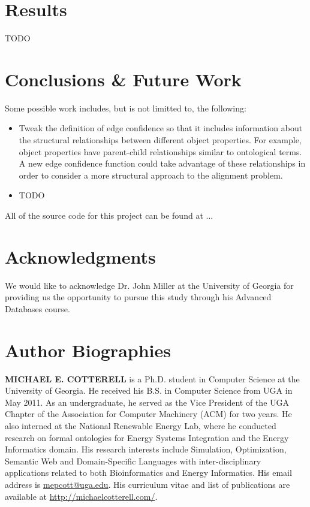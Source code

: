\documentclass[letterpaper,twocolumn,12pt]{article}
\begin{document}
\section{Results}
\label{sec:results}

TODO

\section{Conclusions \& Future Work}
\label{sec:conclusions}


Some possible work includes, but is not limitted to, the following:

\begin{itemize}
\item Tweak the definition of edge confidence so that it includes information about the structural relationships between different object properties.
For example, object properties have parent-child relationships similar to ontological terms.
A new edge confidence function could take advantage of these relationships in order to consider a more structural approach to the alignment problem.
\item TODO
\end{itemize}

All of the source code for this project can be found at ...

\section*{Acknowledgments}

We would like to acknowledge Dr. John Miller at the University of Georgia for providing us the opportunity to pursue this study through his Advanced Databases course. 

%

 

\section*{Author Biographies} 
\vspace{8 pt}
\noindent \textbf{MICHAEL E. COTTERELL} is a Ph.D. student in Computer Science at the University of Georgia. 
He received his B.S. in Computer Science from UGA in May 2011. 
As an undergraduate, he served as the Vice President of the UGA Chapter of the Association for Computer Machinery (ACM) for two years. 
He also interned at the National Renewable Energy Lab, where he conducted research on formal ontologies for Energy Systems Integration and the Energy Informatics domain. 
His research interests include Simulation, Optimization, Semantic Web and Domain-Specific Languages with inter-disciplinary applications related to both Bioinformatics and Energy Informatics.
His email address is \href{mailto:mepcott@uga.edu}{mepcott@uga.edu}.
His curriculum vitae and list of publications are available at \url{http://michaelcotterell.com/}.
\end{document}
